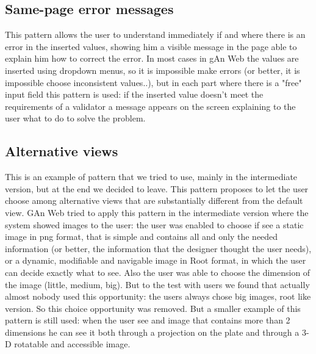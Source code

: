 \subsection{Same-page error messages}

This pattern allows the user to understand immediately if and where there is an error in the inserted values, showing him a visible message in the page able to explain him how to correct the error. In most cases in gAn Web the values are inserted using dropdown menus, so it is impossible make errors (or better, it is impossible choose inconsistent values..), but in each part where there is a "free" input field this pattern is used: if the inserted value doesn't meet the requirements of a validator a message appears on the screen explaining to the user what to do to solve the problem.

\subsection{Alternative views}
This is an example of pattern that we tried to use, mainly in the intermediate version, but at the end we decided to leave. 
This pattern proposes to let the user choose among alternative views that are substantially different from the default view. 
GAn Web tried to apply this pattern in the intermediate version where the system showed images to the user: the user was enabled to choose if see a static image in png format, that is simple and contains all and only the needed information (or better, the information that the designer thought the user needs), or a dynamic, modifiable and navigable image in Root format, in which the user can decide exactly what to see. Also the user was able to choose the dimension of the image (little, medium, big). But to the test with users we found that actually almost nobody used this opportunity: the users always chose big images, root like version. So this choice opportunity was removed. But a smaller example of this pattern is still used: when the user see and image that contains more than 2 dimensions he can see it both through a projection on the plate and through a 3-D rotatable and accessible image.


 